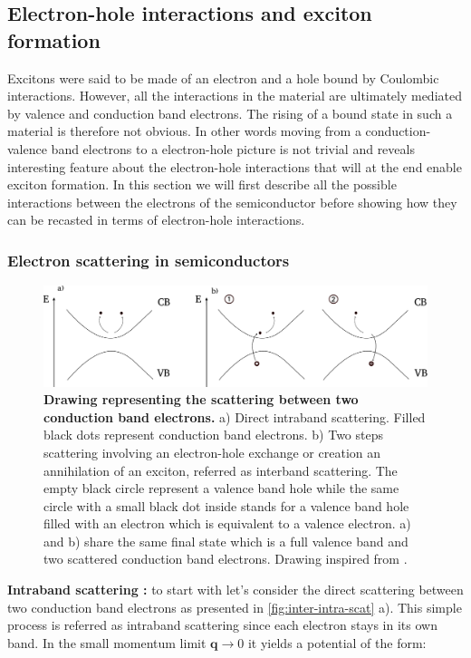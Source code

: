 \subsection{Electron-hole interactions and exciton formation}

Excitons were said to be made of an electron and a hole bound by Coulombic interactions. However, all the interactions in the material are ultimately mediated by valence and conduction band electrons. The rising
of a bound state in such a material is therefore not obvious. In other words moving from a conduction-valence band electrons to a electron-hole picture is not trivial and reveals interesting
feature about the electron-hole interactions that will at the end enable exciton formation. In this section we will first describe all the possible interactions between the electrons of the semiconductor before showing how they can be recasted in terms of electron-hole interactions.

\bigskip
\subsubsection{Electron scattering in semiconductors}
\begin{figure}[h]
    \centering
    \includegraphics[width=1\linewidth]{chap2_theory/fig/intra-inter-band-processes.pdf}
    \caption{\textbf{Drawing representing the scattering between two conduction band electrons.} a) Direct intraband scattering. Filled black dots represent conduction band electrons. b) Two steps scattering involving an electron-hole exchange or creation an annihilation of an exciton, referred as interband scattering.
    The empty black circle represent a valence band hole while the same circle with a small black dot inside stands for a valence band hole filled with an electron which is equivalent to a valence electron. a) and b) share the same
     final state which is a full valence band and two scattered conduction band electrons. Drawing inspired from \cite{Combescot_cooper_excitons_2015}.}
    \label{fig:inter-intra-scat}
\end{figure}


\textbf{Intraband scattering :}
to start with let's consider the direct scattering between two conduction band electrons as presented in \autoref{fig:inter-intra-scat} a). This simple process is referred as intraband scattering since each electron stays in its own band. In the small momentum limit $\mathrm{\textbf{q}}\to 0$ it yields a potential of the form:

